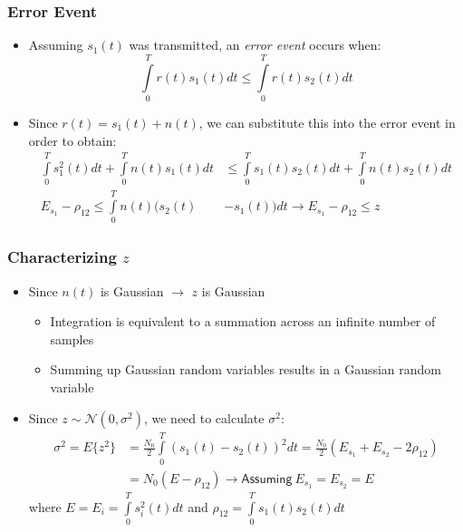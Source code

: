 \documentclass[10pt]{beamer}
\begin{document}
\frame
{
  \frametitle{Error Event}

    \begin{itemize}
        \item Assuming $s_1(t)$ was transmitted, an {\it error event} occurs when:
        \begin{equation}
            {\int\limits_0^Tr(t)s_1(t)dt}\le{\int\limits_0^Tr(t)s_2(t)dt}
        \end{equation}
        \item Since $r(t)=s_1(t)+n(t)$, we can substitute this into the error event in order to obtain:
        \begin{equation}
        \begin{split}
            {\int\limits_0^Ts_1^2(t)dt+\int\limits_0^Tn(t)s_1(t)dt}&\le{\int\limits_0^Ts_1(t)s_2(t)dt+\int\limits_0^Tn(t)s_2(t)dt}\\
            E_{s_1}-\rho_{12}\le\int\limits_0^Tn(t)(s_2(t)&-s_1(t))dt\rightarrow{E_{s_1}-\rho_{12}\le{z}}\nonumber
        \end{split}
        \end{equation}
    \end{itemize}
}
\frame
{
  \frametitle{Characterizing $z$}

    \begin{itemize}
        \item Since $n(t)$ is Gaussian $\rightarrow$ $z$ is Gaussian
        \begin{itemize}
            \item Integration is equivalent to a summation across an infinite number of samples
            \item Summing up Gaussian random variables results in a Gaussian random variable
        \end{itemize}
        \item Since $z\sim\mathcal{N}(0,\sigma^2)$, we need to calculate $\sigma^2$:
        \begin{equation}
        \begin{split}
            \sigma^2=E\{z^2\}&=\frac{N_0}{2}\int\limits_0^T(s_1(t)-s_2(t))^2dt=\frac{N_0}{2}(E_{s_1}+E_{s_2}-2\rho_{12})\\
            &=N_0(E-\rho_{12})\rightarrow\mathsf{Assuming}~E_{s_1}=E_{s_2}=E
        \end{split}
        \end{equation}
        where $E=E_i=\int\limits_0^Ts_i^2(t)dt$ and $\rho_{12}=\int\limits_0^Ts_1(t)s_2(t)dt$
    \end{itemize}
}
\end{document}
